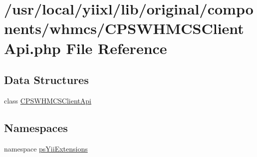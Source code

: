 \hypertarget{CPSWHMCSClientApi_8php}{
\section{/usr/local/yiixl/lib/original/components/whmcs/CPSWHMCSClientApi.php File Reference}
\label{CPSWHMCSClientApi_8php}
}
\subsection*{Data Structures}
\begin{DoxyCompactItemize}
\item 
class \hyperlink{classCPSWHMCSClientApi}{CPSWHMCSClientApi}
\end{DoxyCompactItemize}
\subsection*{Namespaces}
\begin{DoxyCompactItemize}
\item 
namespace \hyperlink{namespacepsYiiExtensions}{psYiiExtensions}
\end{DoxyCompactItemize}
